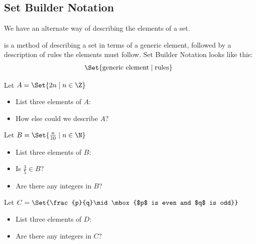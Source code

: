 \subsection{Set Builder Notation} 
We have an alternate way of describing the elements of a set.
\begin{definition}
 is a method of describing a set in terms of a generic element, followed by a description of rules the elements must follow. Set Builder Notation looks like this:
\[
\Set{\mbox{generic element}\mid\mbox{rules}}
\]
\end{definition}
\begin{Example}
Let $A=\Set{2n\mid n\in\Z}$
\begin{itemize}
\item List three elements of $A$:\\
\makeblank[1.5in]\qquad
\makeblank[1.5in]\qquad
\makeblank[1.5in]
\item How else could we describe $A$?\makeblanknew
\end{itemize}
\end{Example}
\begin{Example}
Let $B=\Set{\frac{n}{10}\mid n\in\N}$
\begin{itemize}
\item List three elements of $B$:\\
\makeblank[1.5in]\qquad
\makeblank[1.5in]\qquad
\makeblank[1.5in]
\item Is $\frac{3}{5}\in B$?\makeblanknew
\item Are there any integers in $B$?\makeblanknew
\end{itemize}
\end{Example}
\begin{Example}
Let $C=\Set{\frac{p}{q}\mid\mbox{$p$ is even and $q$ is odd}}$
\begin{itemize}
\item List three elements of $D$:\\
\makeblank[1.5in]\qquad
\makeblank[1.5in]\qquad
\makeblank[1.5in]
\item Are there any integers in $C$?\makeblanknew
\end{itemize}
\end{Example}